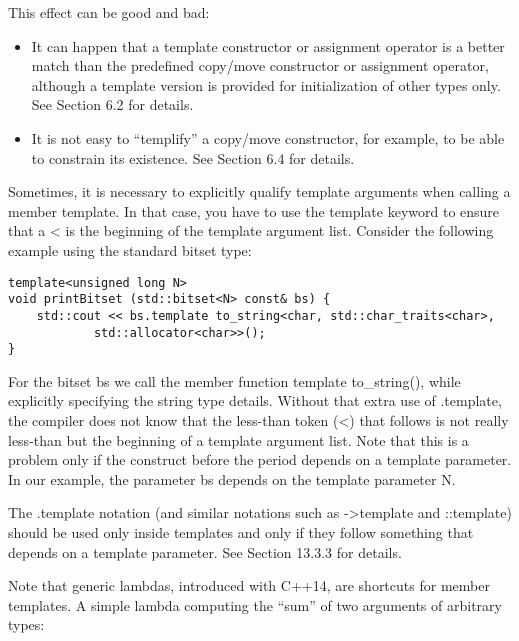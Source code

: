 This effect can be good and bad:

\begin{itemize}
\item 
It can happen that a template constructor or assignment operator is a better match than the predefined copy/move constructor or assignment operator, although a template version is provided for initialization of other types only. See Section 6.2 for details.

\item 
It is not easy to “templify” a copy/move constructor, for example, to be able to constrain its existence. See Section 6.4 for details.
\end{itemize}


Sometimes, it is necessary to explicitly qualify template arguments when calling a member template. In that case, you have to use the template keyword to ensure that a < is the beginning of the template argument list. Consider the following example using the standard bitset type:

\begin{lstlisting}[style=styleCXX]
template<unsigned long N>
void printBitset (std::bitset<N> const& bs) {
	std::cout << bs.template to_string<char, std::char_traits<char>,
			std::allocator<char>>();
}
\end{lstlisting}

For the bitset bs we call the member function template to\_string(), while explicitly specifying the string type details. Without that extra use of .template, the compiler does not know that the less-than token (<) that follows is not really less-than but the beginning of a template argument list. Note that this is a problem only if the construct before the period depends on a template parameter. In our example, the parameter bs depends on the template parameter N.

The .template notation (and similar notations such as ->template and ::template) should be used only inside templates and only if they follow something that depends on a template parameter. See Section 13.3.3 for details.


Note that generic lambdas, introduced with C++14, are shortcuts for member templates. A simple lambda computing the “sum” of two arguments of arbitrary types:


